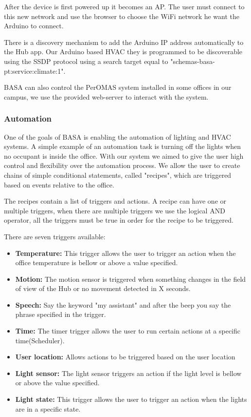 \documentclass[conference]{IEEEtran}
\begin{document}
After the device is first powered up it becomes an \ac{AP}. The user must connect to this new network and use the browser to choose the \ac{WiFi} network he want the Arduino to connect.

There is a discovery mechanism to add the Arduino IP address automatically to the Hub app. Our Arduino based HVAC they is programmed to be discoverable using the \ac{SSDP} protocol using a search target equal to "schemas-basa-pt:service:climate:1".

BASA can also control the PerOMAS system installed in some offices in our campus, we use the provided web-server to interact with the system.

\subsubsection{Automation}

One of the goals of BASA is enabling the automation of lighting and \ac{HVAC} systems. A simple example of an automation task is turning off the lights when no occupant is inside the office.
With our system we aimed to give the user high control and flexibility over the automation process. We allow the user to create chains of simple conditional statements, called "recipes", which are triggered based on events relative to the office.

The recipes contain a list of triggers and actions. A recipe can have one or multiple triggers, when there are multiple triggers we use the logical AND operator, all the triggers must be true in order for the recipe to be triggered.

There are seven triggers available:

\begin{itemize}
  \item \textbf{Temperature:} This trigger allows the user to trigger an action when the office temperature is bellow or above a value specified.
  \item \textbf{Motion:} The motion sensor is triggered when something changes in the field of view of the Hub or no movement detected in X seconds.
  \item \textbf{Speech:} Say the keyword "my assistant" and after the beep you say the phrase specified in the trigger.  
  \item \textbf{Time:} The timer trigger allows the user to run certain actions at a specific time(Scheduler).  
  \item \textbf{User location:} Allows actions to be triggered based on the user location
  \item \textbf{Light sensor:} The light sensor triggers an action if the light level is bellow or above the value specified.
  \item \textbf{Light state:} This trigger allows the user to trigger an action when the lights are in a specific state.
  
\end{itemize}
\end{document}
